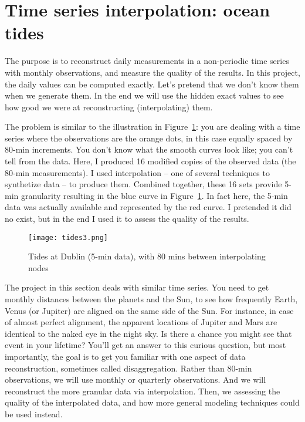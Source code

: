 \documentclass[oneside,10pt]{book}
\begin{document}
\section{Time series interpolation: ocean tides}\label{prgt43zas}

The purpose is to reconstruct  daily measurements in a non-periodic time series with monthly observations, and measure the quality of the
results. 
In this project, the daily values can be computed exactly. Let's pretend that we don't know them when we generate them.  In the end we will use the hidden exact values to see how good we were at reconstructing (interpolating) them.  

The problem is similar to the illustration
 in Figure~\ref{fig:tides}: you are dealing with a time series where the observations are the orange dots, in this case equally spaced by 80-min increments. You don't know what the smooth curves look like; you can't tell from the data. Here, I produced 16 modified copies of the observed data (the 80-min measurements). I used \textcolor{index}{interpolation} -- one of several techniques to synthetize data -- to produce them. Combined together, these 16 sets provide 5-min granularity resulting in the blue curve in Figure~\ref{fig:tides}. In fact here, the 5-min data was actually available and represented by the red curve. I pretended it did no exist, but in the end I used it to assess the quality of the results.

\begin{figure}[H]
\centering
\texttt{[image: tides3.png]} %
\caption{Tides at Dublin (5-min data), with 80 mins between interpolating nodes}
\label{fig:tides}
\end{figure}

The project in this section deals with similar time series. You need to get monthly distances between the planets and the Sun, to see how frequently Earth, Venus (or Jupiter) are aligned on the same side of the Sun. For instance, in case of almost perfect alignment, the apparent locations of Jupiter and Mars are identical to the naked eye in the night sky. Is there a chance you might see that event in your lifetime? You'll get an answer to this curious question, but most importantly, the goal is to get you familiar with one aspect of data reconstruction, sometimes
 called \textcolor{index}{disaggregation}. Rather than 80-min observations, we will use monthly or quarterly observations. And we will reconstruct the more granular data via interpolation. Then, we assessing the quality of the interpolated data, and how more general modeling techniques could be used instead.
\end{document}

